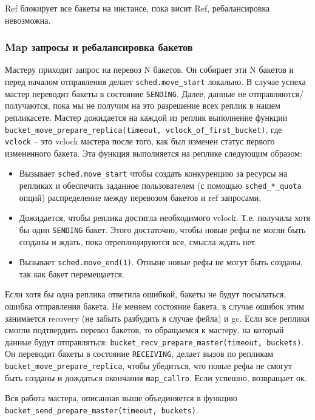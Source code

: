 Ref блокирует все бакеты на инстансе, пока висит Ref, ребалансировка
невозможна.

\subsubsection{Map запросы и ребалансировка бакетов}

Мастеру приходит запрос на перевоз N бакетов. Он собирает эти N бакетов и перед
началом отправления делает \texttt{sched.move_start} локально. В случае успеха
мастер переводит бакеты в состояние \texttt{SENDING}. Далее, данные не
отправляются/получаются, пока мы не получим на это разрешение всех реплик в
нашем репликасете. Мастер дожидается на каждой из реплик выполнение функции
\texttt{bucket_move_prepare_replica(timeout, vclock_of_first_bucket)}, где
\texttt{vclock} -- это vclock мастера после того, как был изменен статус
первого измененного бакета. Эта функция выполняется на реплике следующим
образом:

\begin{itemize}
\item Вызывает \texttt{sched.move_start} чтобы создать конкуренцию за ресурсы
    на репликах и обеспечить заданное пользователем (с помощью
        \texttt{sched_*_quota} опций) распределение между перевозом бакетов и
        ref запросами.
\item Дожидается, чтобы реплика достигла необходимого vclock. Т.е. получила
    хотя бы один \texttt{SENDING} бакет. Этого достаточно, чтобы новые рефы не
        могли быть созданы и ждать, пока отреплицируются все, смысла ждать нет.
\item Вызывает \texttt{sched.move_end(1)}. Отныне новые рефы не могут быть
    созданы, так как бакет перемещается.
\end{itemize}

Если хотя бы одна реплика ответила ошибкой, бакеты не будут посылаться, ошибка
отправления бакета. Не меняем состояние бакета, в случае ошибок этим занимается
recovery (не забыть разбудить в случае фейла) и gc. Если все реплики смогли
подтвердить перевоз бакетов, то обращаемся к мастеру, на который данные будут
отправляться: \texttt{bucket_recv_prepare_master(timeout, buckets)}. Он
переводит бакеты в состояние \texttt{RECEIVING}, делает вызов по репликам
\texttt{bucket_move_prepare_replica}, чтобы убедиться, что новые рефы не смогут
быть созданы и дождаться окончания \texttt{map_callro}. Если успешно,
возвращает ок.

Вся работа мастера, описанная выше объединяется в функцию
\texttt{bucket_send_prepare_master(timeout, buckets)}.

